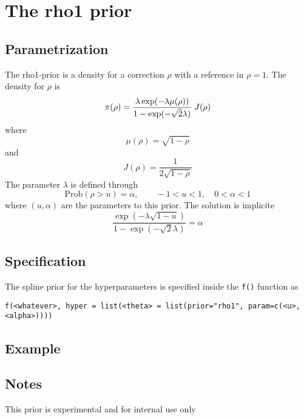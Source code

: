 \documentclass[a4paper,11pt]{article}
\begin{document}
\section*{The rho1 prior}

\subsection*{Parametrization}
The rho1-prior is a density for a correction $\rho$ with a reference
in $\rho=1$. The density for $\rho$ is
\begin{displaymath}
    \pi(\rho) = \frac{\lambda \exp(-\lambda \mu(\rho))}{%
        1-\exp(-\sqrt{2}\lambda)} \; J(\rho)
\end{displaymath}
where
\begin{displaymath}
    \mu(\rho) = \sqrt{1-\rho}
\end{displaymath}
and
\begin{displaymath}
    J(\rho) = \frac{1}{2\sqrt{1-\rho}}
\end{displaymath}
The parameter $\lambda$ is defined through
\begin{displaymath}
    \text{Prob}( \rho > u) = \alpha, \qquad -1 < u < 1, \quad 0<\alpha<1
\end{displaymath}
where $(u, \alpha{})$ are the parameters to this prior. The solution
is implicite
\begin{displaymath}
    \frac{\exp(-\lambda \sqrt{1-u})}{1-\exp(-\sqrt{2}\lambda)} = \alpha
\end{displaymath}

\subsection*{Specification}
The spline prior for the hyperparameters is specified inside the
{\tt f()} function as 
\begin{center}
    {\tt f(<whatever>, hyper = list(<theta> =
        list(prior="rho1", param=c(<u>,<alpha>))))}
\end{center}

\subsection*{Example}

\subsection*{Notes}
This prior is experimental and for internal use only
\end{document}

